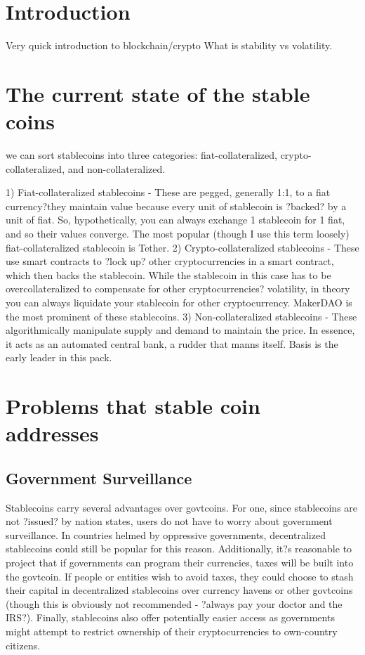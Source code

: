\section{Introduction} 
Very quick introduction to blockchain/crypto
What is stability vs volatility.




\section{The current state of the stable coins} %


we can sort stablecoins into three categories: fiat-collateralized, crypto-collateralized, and non-collateralized.

1) Fiat-collateralized stablecoins - These are pegged, generally 1:1, to a fiat currency?they maintain value because every unit of stablecoin is ?backed? by a unit of fiat. So, hypothetically, you can always exchange 1 stablecoin for 1 fiat, and so their values converge. The most popular (though I use this term loosely) fiat-collateralized stablecoin is Tether.
2) Crypto-collateralized stablecoins - These use smart contracts to ?lock up? other cryptocurrencies in a smart contract, which then backs the stablecoin. While the stablecoin in this case has to be overcollateralized to compensate for other cryptocurrencies? volatility, in theory you can always liquidate your stablecoin for other cryptocurrency. MakerDAO is the most prominent of these stablecoins.
3) Non-collateralized stablecoins - These algorithmically manipulate supply and demand to maintain the price. In essence, it acts as an automated central bank, a rudder that manns itself. Basis is the early leader in this pack.





\section{Problems that stable coin addresses} %
\subsection{Government Surveillance}
Stablecoins carry several advantages over govtcoins. For one, since stablecoins are not ?issued? by nation states, users do not have to worry about government surveillance. In countries helmed by oppressive governments, decentralized stablecoins could still be popular for this reason. Additionally, it?s reasonable to project that if governments can program their currencies, taxes will be built into the govtcoin. If people or entities wish to avoid taxes, they could choose to stash their capital in decentralized stablecoins over currency havens or other govtcoins (though this is obviously not recommended - ?always pay your doctor and the IRS?). Finally, stablecoins also offer potentially easier access as governments might attempt to restrict ownership of their cryptocurrencies to own-country citizens.

